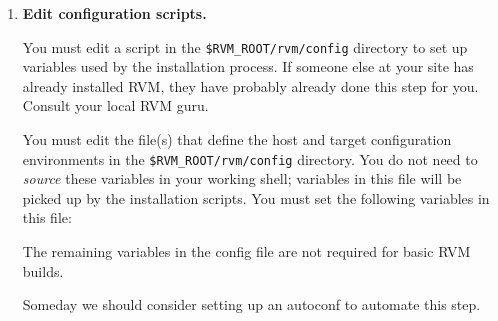 \begin{enumerate}
These two variables point to the same file when the type of system  
doing the build is the same as where  you are going 
the execute the RVM. To cross build a system
e.g., build on AIX\AIXTMFootnote/powerPC\PowerPCTMFootnote for a
Linux/IA32 platform, see the section on Cross 
Platform Building.

\item {\bf Edit configuration scripts.}

You must edit a script in the {\tt \$RVM\_ROOT/rvm/config}  directory to set 
up variables used by the installation process.  
If someone else at your site has already installed RVM, they have
probably already done this step for you.  Consult your local RVM guru.

You must edit the file(s) that define the host and target configuration
environments in the {\tt \$RVM\_ROOT/rvm/config} directory.  
You do not need to {\em source} these variables in your working shell; 
variables in this file will be picked up by the installation scripts.  
You must set the following variables in this file:

The remaining variables in the config file are not required for basic RVM
builds.

Someday we should consider setting up an autoconf to automate this
step.


\end{enumerate}
